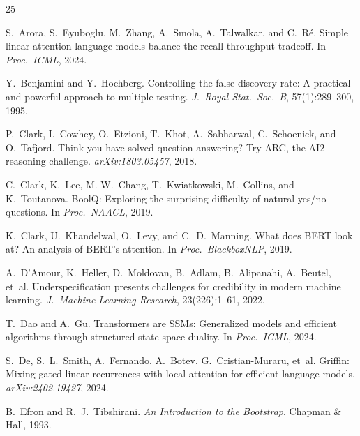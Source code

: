 \documentclass[11pt,twocolumn]{article}
\begin{document}
\begin{thebibliography}{25}

S.~Arora, S.~Eyuboglu, M.~Zhang, A.~Smola, A.~Talwalkar, and C.~R\'{e}.
\newblock Simple linear attention language models balance the recall-throughput tradeoff.
\newblock In \emph{Proc.\ ICML}, 2024.

Y.~Benjamini and Y.~Hochberg.
\newblock Controlling the false discovery rate: A practical and powerful approach to multiple testing.
\newblock \emph{J.\ Royal Stat.\ Soc.\ B}, 57(1):289--300, 1995.

P.~Clark, I.~Cowhey, O.~Etzioni, T.~Khot, A.~Sabharwal, C.~Schoenick, and O.~Tafjord.
\newblock Think you have solved question answering? {T}ry {ARC}, the {AI2} reasoning challenge.
\newblock \emph{arXiv:1803.05457}, 2018.

C.~Clark, K.~Lee, M.-W.~Chang, T.~Kwiatkowski, M.~Collins, and K.~Toutanova.
\newblock Bool{Q}: Exploring the surprising difficulty of natural yes/no questions.
\newblock In \emph{Proc.\ NAACL}, 2019.

K.~Clark, U.~Khandelwal, O.~Levy, and C.~D.~Manning.
\newblock What does {BERT} look at? {A}n analysis of {BERT}'s attention.
\newblock In \emph{Proc.\ BlackboxNLP}, 2019.

A.~D'Amour, K.~Heller, D.~Moldovan, B.~Adlam, B.~Alipanahi, A.~Beutel, et~al.
\newblock Underspecification presents challenges for credibility in modern machine learning.
\newblock \emph{J.\ Machine Learning Research}, 23(226):1--61, 2022.

T.~Dao and A.~Gu.
\newblock Transformers are {SSM}s: Generalized models and efficient algorithms through structured state space duality.
\newblock In \emph{Proc.\ ICML}, 2024.

S.~De, S.~L.~Smith, A.~Fernando, A.~Botev, G.~Cristian-Muraru, et~al.
\newblock Griffin: Mixing gated linear recurrences with local attention for efficient language models.
\newblock \emph{arXiv:2402.19427}, 2024.

B.~Efron and R.~J.~Tibshirani.
\newblock \emph{An Introduction to the Bootstrap}.
\newblock Chapman \& Hall, 1993.


\end{thebibliography}
\end{document}
